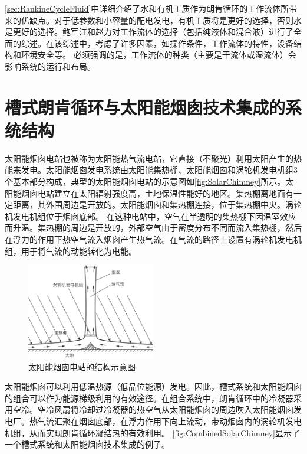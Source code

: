 \autoref{sec:RankineCycleFluid}中详细介绍了水和有机工质作为朗肯循环的工作流体所带来的优缺点。对于低参数和小容量的配电发电，有机工质将是更好的选择，否则水是更好的选择。鲍军江和赵力\cite{Bao2013}对工作流体的选择（包括纯液体和混合液）进行了全面的综述。在该综述中，考虑了许多因素，如操作条件，工作流体的特性，设备结构和环境安全等。
必须强调的是，工作流体的种类（主要是干流体或湿流体）会影响系统的运行和布局。

\section{槽式朗肯循环与太阳能烟囱技术集成的系统结构}
\label{sec:sc}

太阳能烟囱电站也被称为太阳能热气流电站，它直接（不聚光）利用太阳产生的热能来发电。太阳能烟囱发电系统由太阳能集热棚、太阳能烟囱和涡轮机发电机组3个基本部分构成，典型的太阳能烟囱电站的示意图如\autoref{fig:SolarChimney}所示。太阳能烟囱电站建立在太阳辐射强度高，土地保温性能好的地区。集热棚离地面有一定距离，其外围周边是开放的。太阳能烟囱和集热棚连接，位于集热棚中央。涡轮机发电机组位于烟囱底部。
在这种电站中，空气在半透明的集热棚下因温室效应而升温。集热棚的周边是开放的，外部空气由于密度分布不同而流入集热棚，然后在浮力的作用下热空气流入烟囱产生热气流。在气流的路径上设置有涡轮机发电机组，用于将气流的动能转化为电能。

\begin{figure}[!ht]
\centering 
\includegraphics[width=0.5\textwidth]{fig/SolarChimney}
\caption{太阳能烟囱电站的结构示意图}\label{fig:SolarChimney}
\end{figure}

太阳能烟囱可以利用低温热源（低品位能源）发电。因此，槽式系统和太阳能烟囱的组合可以作为能源梯级利用的有效途径。在组合系统中，朗肯循环中的冷凝器采用空冷。空冷风扇将冷却过冷凝器的热空气从太阳能烟囱的周边吹入太阳能烟囱发电厂。热气流汇聚在烟囱底部，在浮力作用下向上流动，带动烟囱内的涡轮机发电机组，从而实现朗肯循环凝结热的有效利用。
\autoref{fig:CombinedSolarChimney}显示了一个槽式系统和太阳能烟囱技术集成的例子。


